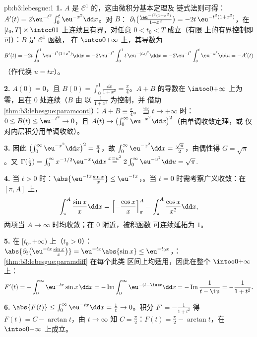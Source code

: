 \begin{solution}{pb:b3:lebesgue:1}
\textbf{1.} $A$ 是 $\mathcal C^1$ 的，这由微积分基本定理及
链式法则可得：$A'(t) =
2\eu^{-t^2}\int_0^t\eu^{-x^2}\dd x$。对 $B$：
$\partial_t\bigl(\frac{\eu^{-t^2(1+x^2)}}{1+x^2}\bigr) =
-2t\,\eu^{-t^2(1+x^2)}$，在 $[t_0, T]
\times \intcc01$ 上连续且有界，对任意 $0 < t_0 < T$ 成立（有限
上的有界控制即可）：$B$ 是 $\mathcal C^1$ 函数，
在 $\intoo0{+\infty}$ 上，其导数为
\[
B'(t) = -2t\int_0^1 \eu^{-t^2(1+x^2)}\dd x
= -2\eu^{-t^2}\int_0^1 t\,\eu^{-(tx)^2}\dd x
= -2\eu^{-t^2}\int_0^t\eu^{-u^2}\dd u = -A'(t)
\]
（作代换 $u = tx$）。

\textbf{2.} $A(0) = 0$，且 $B(0) = \int_0^1\frac{\dd x}{1+x^2}
= \frac\pi4$。$A + B$ 的导数在
$\intoo0{+\infty}$ 上为零，且在 $0$ 处连续（$B$ 由
以 $\frac1{1+x^2}$ 为控制，并
借助\cref{thm:b3:lebesgue:paramcont}）：$A + B \equiv \frac\pi4$。
当 $t\to+\infty$ 时：$0 \leq B(t) \leq \eu^{-t^2} \to 0$，且
$A(t) \to \bigl(\int_0^\infty\eu^{-x^2}\dd x\bigr)^2$（由单调收敛定理，或
仅对内层积分用单调收敛）。

\textbf{3.} 因此 $\bigl(\int_0^\infty\eu^{-x^2}\dd x\bigr)^2
= \frac\pi4$，故 $\int_0^\infty\eu^{-x^2}\dd x =
\frac{\sqrt\pi}2$，由偶性得 $G = \sqrt\pi$。又
$\Gamma(\frac12) = \int_0^\infty x^{-1/2}\eu^{-x}\dd x
\overset{x = u^2}{=} 2\int_0^\infty\eu^{-u^2}\dd u =
\sqrt\pi$.

\textbf{4.} 当 $t > 0$ 时：$\abs{\eu^{-tx}\frac{\sin x}x} \leq
\eu^{-tx}$，。当 $t = 0$ 时需考察广义收敛：在
$[\pi, A]$ 上，
\[
\int_\pi^A\frac{\sin x}x\dd x
= \Bigl[-\frac{\cos x}x\Bigr]_\pi^A -
\int_\pi^A\frac{\cos x}{x^2}\dd x,
\]
两项当 $A \to \infty$ 时均收敛；在 $0$ 附近，被积函数
可连续延拓为 $1$。

\textbf{5.} 在 $[t_0, +\infty)$ 上（$t_0 > 0$）：
$\abs{\partial_t\bigl(\eu^{-tx}\tfrac{\sin x}x\bigr)} =
\eu^{-tx}\abs{\sin x} \leq \eu^{-t_0x}$，：
\cref{thm:b3:lebesgue:paramdiff} 在每个此类
区间上均适用，因此在整个 $\intoo0{+\infty}$ 上：
\[
F'(t) = -\int_0^\infty\eu^{-tx}\sin x\,\dd x
= -\operatorname{Im}\int_0^\infty\eu^{-(t - \iu)x}\dd x
= -\operatorname{Im}\frac{1}{t - \iu} = -\frac{1}{1 + t^2}.
\]

\textbf{6.} $\abs{F(t)} \leq \int_0^\infty\eu^{-tx}\dd x =
\frac1t \to 0$。积分 $F' = -\frac1{1+t^2}$ 得 $F(t) = C -
\arctan t$，由 $t \to \infty$ 知 $C = \frac\pi2$：$F(t) =
\frac\pi2 - \arctan t$，在 $\intoo0{+\infty}$ 上成立。


\end{solution}
